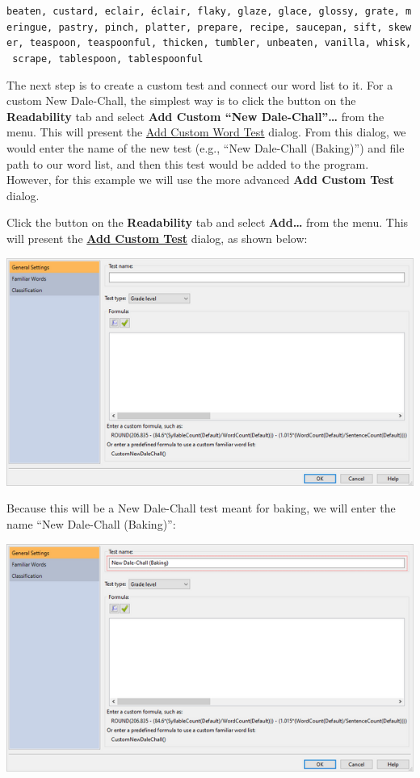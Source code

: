\documentclass[
]{book}
\theoremstyle{definition}
\theoremstyle{definition}
\theoremstyle{definition}
\theoremstyle{definition}
\theoremstyle{remark}
\begin{document}
\texttt{beaten,\ custard,\ eclair,\ éclair,\ flaky,\ glaze,\ glace,\ glossy,\ grate,\ meringue,\ pastry,\ pinch,\ platter,\ prepare,\ recipe,\ saucepan,\ sift,\ skewer,\ teaspoon,\ teaspoonful,\ thicken,\ tumbler,\ unbeaten,\ vanilla,\ whisk,\ scrape,\ tablespoon,\ tablespoonful}

The next step is to create a custom test and connect our word list to it. For a custom New Dale-Chall, the simplest way is to click the  button on the \textbf{Readability} tab and select \textbf{Add Custom ``New Dale-Chall''\ldots{}} from the menu. This will present the \protect\hyperlink{add-custom-word-test}{Add Custom Word Test} dialog. From this dialog, we would enter the name of the new test (e.g., ``New Dale-Chall (Baking)'') and file path to our word list, and then this test would be added to the program. However, for this example we will use the more advanced \textbf{Add Custom Test} dialog.

Click the  button on the \textbf{Readability} tab and select \textbf{Add\ldots{}} from the menu. This will present the \protect\hyperlink{custom-test-general-settings}{\textbf{Add Custom Test}} dialog, as shown below:

\includegraphics{Images/AddCustomTest.png}

Because this will be a New Dale-Chall test meant for baking, we will enter the name ``New Dale-Chall (Baking)'':

\includegraphics{Images/CustomTestExample2Name.png}
\end{document}
